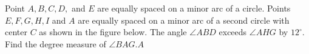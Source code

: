 Point $A,B,C,D,$ and $E$ are equally spaced on a minor arc of a circle. Points $E,F,G,H,I$ and $A$ are equally spaced on a minor arc of a second circle with center $C$ as shown in the figure below. The angle $\angle ABD$ exceeds $\angle AHG$ by $12^\circ$. Find the degree measure of $\angle BAG$.$A$